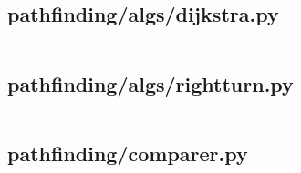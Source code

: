 \documentclass[a4paper, 12pt]{article}
\begin{document}
\begin{appendices}
    \subsection{pathfinding/algs/dijkstra.py}
    \inputminted[python3, linenos, breaklines, frame=lines, fontsize=\footnotesize]{python}{../pathfinding/algs/dijkstra.py}

    \subsection{pathfinding/algs/rightturn.py}
    \inputminted[python3, linenos, breaklines, frame=lines, fontsize=\footnotesize]{python}{../pathfinding/algs/rightturn.py}

    \subsection{pathfinding/comparer.py}
    \inputminted[python3, linenos, breaklines, frame=lines, fontsize=\footnotesize]{python}{../pathfinding/comparer.py}


\end{appendices}
\end{document}
